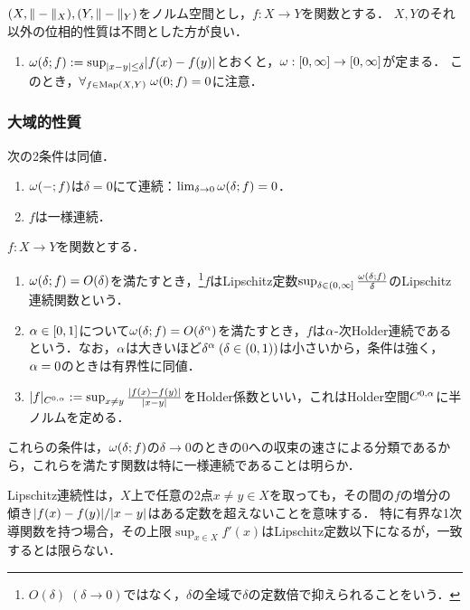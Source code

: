 \documentclass[uplatex,dvipdfmx]{jsreport}
\begin{document}
\begin{definition}
    $(X,\|-\|_X),(Y,\|-\|_Y)$をノルム空間とし，$f:X\to Y$を関数とする．
    $X,Y$のそれ以外の位相的性質は不問とした方が良い．
    \begin{enumerate}
        \item $\omega(\delta;f):=\sup_{\lvert x-y\rvert\le\delta}\lvert f(x)-f(y)\rvert$とおくと，$\omega:[0,\infty]\to[0,\infty]$が定まる．
        このとき，$\forall_{f\in\mathrm{Map}(X,Y)}\;\omega(0;f)=0$に注意．
    \end{enumerate}
\end{definition}

\subsubsection{大域的性質}

\begin{lemma}
    次の2条件は同値．
    \begin{enumerate}
        \item $\omega(-;f)$は$\delta=0$にて連続：$\lim_{\delta\to0}\omega(\delta;f)=0$．
        \item $f$は一様連続．
    \end{enumerate}
\end{lemma}

\begin{definition}
    $f:X\to Y$を関数とする．
    \begin{enumerate}
        \item $\omega(\delta;f)=O(\delta)$を満たすとき，\footnote{$O(\delta)\;(\delta\to0)$ではなく，$\delta$の全域で$\delta$の定数倍で抑えられることをいう．}$f$はLipschitz定数$\sup_{\delta\in(0,\infty]}\frac{\omega(\delta;f)}{\delta}$のLipschitz連続関数という．
        \item $\alpha\in[0,1]$について$\omega(\delta;f)=O(\delta^\alpha)$を満たすとき，$f$は$\alpha$-次Holder連続であるという．なお，$\alpha$は大きいほど$\delta^\alpha\;(\delta\in(0,1))$は小さいから，条件は強く，$\alpha=0$のときは有界性に同値．
        \item $\lvert f\rvert_{C^{0,\alpha}}:=\sup_{x\ne y}\frac{\lvert f(x)-f(y)\rvert}{\lvert x-y\rvert}$をHolder係数といい，これはHolder空間$C^{0,\alpha}$に半ノルムを定める．
    \end{enumerate}
    これらの条件は，$\omega(\delta;f)$の$\delta\to0$のときの$0$への収束の速さによる分類であるから，これらを満たす関数は特に一様連続であることは明らか．
\end{definition}
\begin{remarks}
    Lipschitz連続性は，$X$上で任意の2点$x\ne y\in X$を取っても，その間の$f$の増分の傾き$\lvert f(x)-f(y)\rvert/\lvert x-y\rvert$はある定数を超えないことを意味する．
    特に有界な1次導関数を持つ場合，その上限$\sup_{x\in X}f'(x)$はLipschitz定数以下になるが，一致するとは限らない．
\end{remarks}
\end{document}
